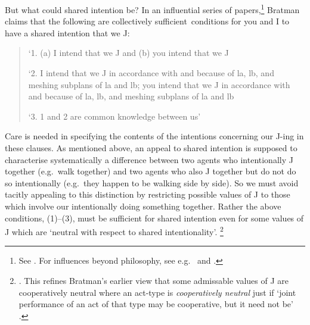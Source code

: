 \documentclass[12pt,\papersize]{extarticle}
\begin{document}
But what could shared intention be?
In an influential series of papers,\footnote{ 
See \citet{Bratman:1992mi,Bratman:1993je,Bratman:1999fr,Bratman:2009lv}.
For influences beyond philosophy, see e.g.\ \citet{Tomasello:2005wx} and \citet{Knoblich:2008hy}. 
}
Bratman claims that the following are collectively sufficient\footnotemark \ conditions for you and I to have a shared intention that we J:
%
%
\begin{quote}
\label{quote:bratman_account}
`1. (a) I intend that we J and (b) you intend that we J
 
`2. I intend that we J in accordance with and because of la, lb, and meshing subplans of la and lb; you intend that we J in accordance with and because of la, lb, and meshing subplans of la and lb
 
`3. 1 and 2 are common knowledge between us' \citep[][p.\ View 4]{Bratman:1993je}
\end{quote}
%
Care is needed in specifying the contents of the intentions concerning our J-ing in these clauses. 
As mentioned above, an appeal to shared intention is supposed to  characterise systematically a difference between two agents who intentionally J together (e.g.\ walk  together) and two agents who also  J together but do not do so intentionally (e.g.\ they happen to be walking side by side). 
So we must avoid tacitly appealing to this distinction by  restricting possible values of J to those which involve our intentionally doing something together. 
Rather the above  conditions, (1)--(3), must be sufficient for shared intention even for some values of J which are `neutral with respect to shared intentionality'.%
\footnote{
 \citet[p.\ 147]{Bratman:1999fr}.
 This refines Bratman's earlier view that some admissable values of J are cooperatively neutral 
 	where an  act-type is \emph{cooperatively neutral} just if `joint performance of an act of that type may be cooperative, but it need not be' \citep[p.\ 330]{Bratman:1992mi}. 
}
\end{document}
